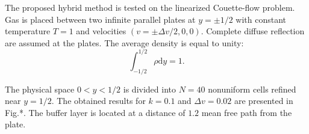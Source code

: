 \documentclass{article}
\theoremstyle{plain}
\newcommand{\dd}{\mathrm{d}}
\begin{document}
The proposed hybrid method is tested on the linearized Couette-flow problem.
Gas is placed between two infinite parallel plates at \(y=\pm1/2\) with constant temperature \(T=1\)
and velocities \((v = \pm\Delta v/2, 0, 0)\).
Complete diffuse reflection are assumed at the plates.
The average density is equal to unity:
\begin{equation}\label{eq:total_mass}
    \int_{-1/2}^{1/2}\rho\dd{y} = 1.
\end{equation}

The physical space \(0<y<1/2\) is divided into \(N=40\) nonuniform cells refined near \(y=1/2\).
The obtained results for \(k=0.1\) and \(\Delta v = 0.02\) are presented in Fig.*.
The buffer layer is located at a distance of \(1.2\) mean free path from the plate.




\printbibliography
\end{document}
